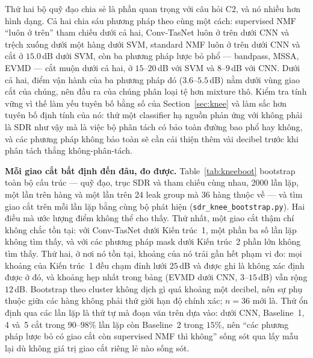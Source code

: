 \documentclass[11pt]{article}
\begin{document}
Thứ hai bộ quỹ đạo chia sẻ là phần quan trọng với câu hỏi C2, và nó nhiều
hơn hình dạng. Cả hai chia sáu phương pháp theo cùng một cách: supervised
NMF ``luôn ở trên'' tham chiếu dưới cả hai, Conv-TasNet luôn ở trên dưới
CNN và trệch xuống dưới một hàng dưới SVM, standard NMF luôn ở trên dưới
CNN và cắt ở $15.0$\,dB dưới SVM, còn ba phương pháp lược bỏ phổ ---
bandpass, MSSA, EVMD --- cắt muộn dưới cả hai, ở $15$--$20$\,dB với SVM
và $8$--$9$\,dB với CNN. Dưới cả hai, điểm vận hành của ba phương pháp
đó ($3.6$--$5.5$\,dB) nằm dưới vùng giao cắt của chúng, nên đầu ra của
chúng phân loại tệ hơn mixture thô. Kiểm tra tính vững vì thế làm yếu
tuyên bố bằng số của Section~\ref{sec:knee} và làm sắc hơn tuyên bố định
tính của nó: thứ một classifier hạ nguồn phản ứng với không phải là SDR
như vậy mà là việc bộ phân tách có bảo toàn đường bao phổ hay không, và
các phương pháp không bảo toàn sẽ cần cải thiện thêm vài decibel trước
khi phân tách thắng không-phân-tách.

\textbf{Mỗi giao cắt bất định đến đâu, đo được.} Table~\ref{tab:kneeboot}
bootstrap toàn bộ cấu trúc --- quỹ đạo, trục SDR và tham chiếu cùng nhau,
2000 lần lặp, một lần trên hàng và một lần trên 24 leak group mà 36 hàng
thuộc về --- và tìm giao cắt trên mỗi lần lặp bằng cùng bộ phát hiện
(\texttt{sdr\_knee\_bootstrap.py}). Hai điều mà ước lượng điểm không thể
cho thấy. Thứ nhất, một giao cắt thậm chí không chắc tồn tại: với
Conv-TasNet dưới Kiến trúc~1, một phần ba số lần lặp không tìm thấy, và
với các phương pháp mask dưới Kiến trúc~2 phần lớn không tìm thấy. Thứ
hai, ở nơi nó tồn tại, khoảng của nó trải gần hết phạm vi đo: mọi khoảng
của Kiến trúc~1 đều chạm đỉnh lưới $25$\,dB và được ghi là không xác định
được ở đó, và khoảng hẹp nhất trong bảng (EVMD dưới CNN, $3$--$15$\,dB)
vẫn rộng $12$\,dB. Bootstrap theo cluster không dịch gì quá khoảng một
decibel, nên sự phụ thuộc giữa các hàng không phải thứ giới hạn độ chính
xác; $n{=}36$ mới là. Thứ ổn định qua các lần lặp là thứ tự mà đoạn văn
trên dựa vào: dưới CNN, Baseline~1, 4 và~5 cắt trong $90$--$98\%$ lần lặp
còn Baseline~2 trong $15\%$, nên ``các phương pháp lược bỏ có giao cắt
còn supervised NMF thì không'' sống sót qua lấy mẫu lại dù không giá trị
giao cắt riêng lẻ nào sống sót.
\end{document}
